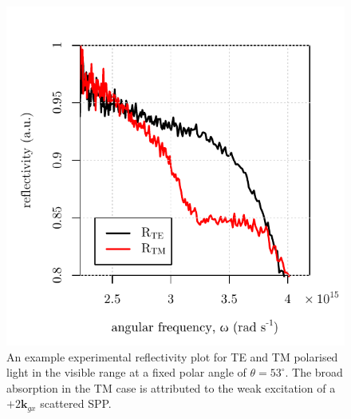 \begin{figure}
\begin{center}
\includegraphics{2nd-order-mode/figure-TM-2ndorder-mode-spectra-exp.pdf}
\caption[An example experimental reflectivity plot for TE and TM polarised light in the visible range at a fixed polar angle of $\theta=53^\circ$.]{An example experimental reflectivity plot for TE and TM polarised light in the visible range at a fixed polar angle of $\theta=53^\circ$. The broad absorption in the TM case is attributed to the weak excitation of a $+2\mathbf{k}_{gx}$ scattered SPP. \label{fig:zz2ndordermodesSpectraAt53Degrees}}
\end{center}
\end{figure}

